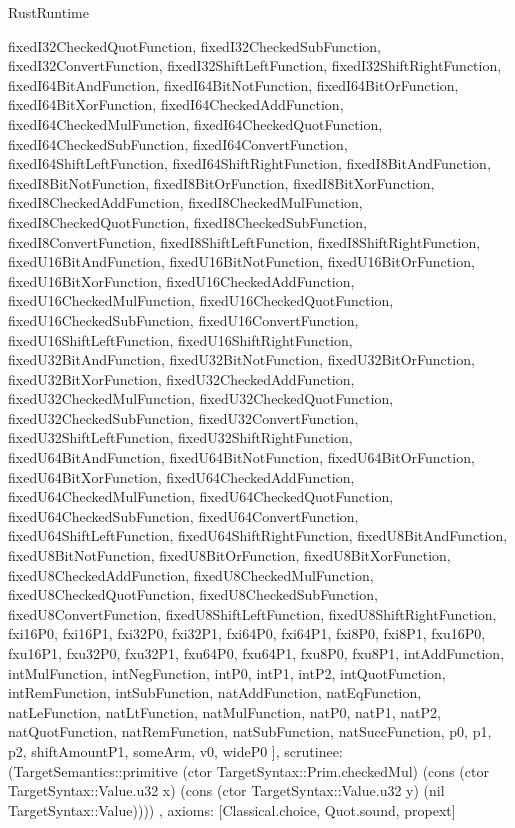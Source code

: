 \begin{lexlean}{RustRuntime}
\begin{semanticmodule}
{{      fixedI32CheckedQuotFunction,
      fixedI32CheckedSubFunction,
      fixedI32ConvertFunction,
      fixedI32ShiftLeftFunction,
      fixedI32ShiftRightFunction,
      fixedI64BitAndFunction,
      fixedI64BitNotFunction,
      fixedI64BitOrFunction,
      fixedI64BitXorFunction,
      fixedI64CheckedAddFunction,
      fixedI64CheckedMulFunction,
      fixedI64CheckedQuotFunction,
      fixedI64CheckedSubFunction,
      fixedI64ConvertFunction,
      fixedI64ShiftLeftFunction,
      fixedI64ShiftRightFunction,
      fixedI8BitAndFunction,
      fixedI8BitNotFunction,
      fixedI8BitOrFunction,
      fixedI8BitXorFunction,
      fixedI8CheckedAddFunction,
      fixedI8CheckedMulFunction,
      fixedI8CheckedQuotFunction,
      fixedI8CheckedSubFunction,
      fixedI8ConvertFunction,
      fixedI8ShiftLeftFunction,
      fixedI8ShiftRightFunction,
      fixedU16BitAndFunction,
      fixedU16BitNotFunction,
      fixedU16BitOrFunction,
      fixedU16BitXorFunction,
      fixedU16CheckedAddFunction,
      fixedU16CheckedMulFunction,
      fixedU16CheckedQuotFunction,
      fixedU16CheckedSubFunction,
      fixedU16ConvertFunction,
      fixedU16ShiftLeftFunction,
      fixedU16ShiftRightFunction,
      fixedU32BitAndFunction,
      fixedU32BitNotFunction,
      fixedU32BitOrFunction,
      fixedU32BitXorFunction,
      fixedU32CheckedAddFunction,
      fixedU32CheckedMulFunction,
      fixedU32CheckedQuotFunction,
      fixedU32CheckedSubFunction,
      fixedU32ConvertFunction,
      fixedU32ShiftLeftFunction,
      fixedU32ShiftRightFunction,
      fixedU64BitAndFunction,
      fixedU64BitNotFunction,
      fixedU64BitOrFunction,
      fixedU64BitXorFunction,
      fixedU64CheckedAddFunction,
      fixedU64CheckedMulFunction,
      fixedU64CheckedQuotFunction,
      fixedU64CheckedSubFunction,
      fixedU64ConvertFunction,
      fixedU64ShiftLeftFunction,
      fixedU64ShiftRightFunction,
      fixedU8BitAndFunction,
      fixedU8BitNotFunction,
      fixedU8BitOrFunction,
      fixedU8BitXorFunction,
      fixedU8CheckedAddFunction,
      fixedU8CheckedMulFunction,
      fixedU8CheckedQuotFunction,
      fixedU8CheckedSubFunction,
      fixedU8ConvertFunction,
      fixedU8ShiftLeftFunction,
      fixedU8ShiftRightFunction,
      fxi16P0,
      fxi16P1,
      fxi32P0,
      fxi32P1,
      fxi64P0,
      fxi64P1,
      fxi8P0,
      fxi8P1,
      fxu16P0,
      fxu16P1,
      fxu32P0,
      fxu32P1,
      fxu64P0,
      fxu64P1,
      fxu8P0,
      fxu8P1,
      intAddFunction,
      intMulFunction,
      intNegFunction,
      intP0,
      intP1,
      intP2,
      intQuotFunction,
      intRemFunction,
      intSubFunction,
      natAddFunction,
      natEqFunction,
      natLeFunction,
      natLtFunction,
      natMulFunction,
      natP0,
      natP1,
      natP2,
      natQuotFunction,
      natRemFunction,
      natSubFunction,
      natSuccFunction,
      p0,
      p1,
      p2,
      shiftAmountP1,
      someArm,
      v0,
      wideP0
    ],
    scrutinee: (TargetSemantics::primitive (ctor TargetSyntax::Prim.checkedMul) (cons (ctor TargetSyntax::Value.u32 x) (cons (ctor TargetSyntax::Value.u32 y) (nil TargetSyntax::Value))))
  },
  axioms: [Classical.choice, Quot.sound, propext]
}


\end{semanticmodule}
\end{lexlean}
